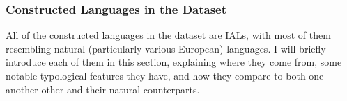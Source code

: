 \documentclass[12pt,a4paper]{article}
\numberwithin{figure}{section}
\numberwithin{table}{section}
\numberwithin{definition}{section}
\begin{document}

\subsubsection{Constructed Languages in the Dataset}
\label{ssec:constructedlanguagesinthedataset}


All of the constructed languages in the dataset are IALs, with most of them resembling natural (particularly various European) languages. I will briefly introduce each of them in this section, explaining where they come from, some notable typological features they have, and how they compare to both one another other and their natural counterparts.
\end{document}
